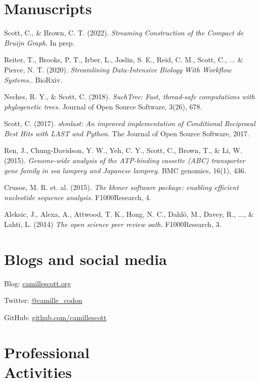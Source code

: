\documentclass[margin,12pt]{camille_resume}
\begin{document}
\begin{resume}


\section{\mysidestyle Manuscripts}

Scott, C., \& Brown, C. T. (2022). {\em Streaming Construction of the Compact de Bruijn Graph}. In prep.

Reiter, T., Brooks, P. T., Irber, L., Joslin, S. E., Reid, C. M., Scott, C., ... \& Pierce, N. T. (2020). {\em Streamlining Data-Intensive Biology With Workflow Systems.}. BioRxiv.

Neches, R. Y., \& Scott, C. (2018). {\em SuchTree: Fast, thread-safe computations with phylogenetic trees.} Journal of Open Source Software, 3(26), 678.

Scott, C. (2017). {\em shmlast: An improved implementation of Conditional Reciprocal Best Hits with LAST and Python.} The Journal of Open Source Software, 2017.

Ren, J., Chung-Davidson, Y. W., Yeh, C. Y., Scott, C., Brown, T., \& Li, W. (2015). {\em Genome-wide analysis of the ATP-binding cassette (ABC) transporter gene family in sea lamprey and Japanese lamprey.} BMC genomics, 16(1), 436.

Crusoe, M. R. et. al. (2015). {\em The khmer software package: enabling efficient nucleotide sequence analysis.} F1000Research, 4.

Aleksic, J., Alexa, A., Attwood, T. K., Hong, N. C., Dahlö, M., Davey, R., ..., \& Lahti, L. (2014)
{\em The open science peer review oath.} F1000Research, 3.

\pagebreak

\section{\mysidestyle Blogs and social media}

Blog: \href{http://camillescott.org}{camillescott.org}  

Twitter: \href{http://twitter.com/camille\_codon}{@camille\_codon}

GitHub: \href{https://github.com/camillescott}{github.com/camillescott}


    \section{\mysidestyle Professional\\Activities}


\end{resume}
\end{document}
